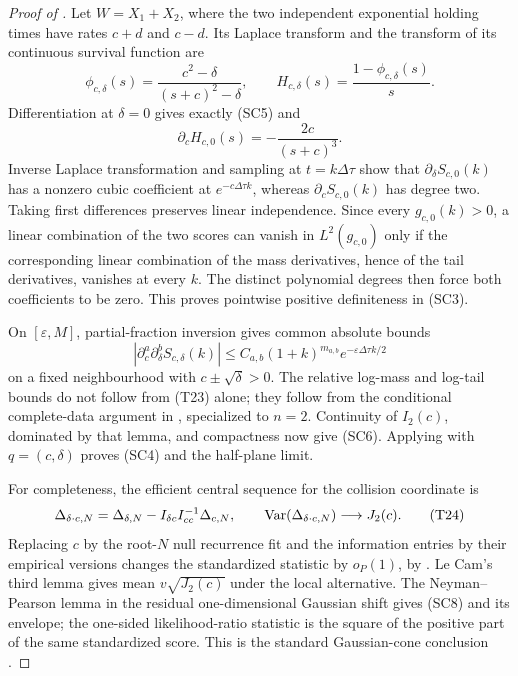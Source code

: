 \begin{proof}[Proof of ]
Let \(W=X_1+X_2\), where the two independent exponential holding times have
rates \(c+d\) and \(c-d\).  Its Laplace transform and the transform of its
continuous survival function are
\[
 \phi_{c,\delta}(s)
 =\frac{c^2-\delta}{(s+c)^2-\delta},
 \qquad
 H_{c,\delta}(s)=\frac{1-\phi_{c,\delta}(s)}s.
\tag{T21}
\]
Differentiation at \(\delta=0\) gives exactly \textup{(SC5)} and
\[
 \partial_cH_{c,0}(s)=-\frac{2c}{(s+c)^3}.
\tag{T22}
\]
Inverse Laplace transformation and sampling at \(t=k\Delta\tau\) show that
\(\partial_\delta S_{c,0}(k)\) has a nonzero cubic coefficient at
\(e^{-c\Delta\tau k}\), whereas \(\partial_cS_{c,0}(k)\) has degree two.
Taking first differences preserves linear independence.  Since every
\(g_{c,0}(k)>0\), a linear combination of the two scores can vanish in
\(L^2(g_{c,0})\) only if the corresponding linear combination of the mass
derivatives, hence of the tail derivatives, vanishes at every \(k\).  The
distinct polynomial degrees then force both coefficients to be zero.  This
proves pointwise positive definiteness in \textup{(SC3)}.

On \([\varepsilon,M]\), partial-fraction inversion gives common absolute
bounds
\[
 |\partial_c^a\partial_\delta^b S_{c,\delta}(k)|
 \le C_{a,b}(1+k)^{m_{a,b}}e^{-\varepsilon\Delta\tau k/2}
\tag{T23}
\]
on a fixed neighbourhood with \(c\pm\sqrt\delta>0\).  The relative log-mass
and log-tail bounds do not follow from \textup{(T23)} alone; they follow from
the conditional complete-data argument in
, specialized to \(n=2\).
Continuity of \(I_2(c)\), dominated by that lemma, and compactness now give
\textup{(SC6)}.  Applying
 with
\(q=(c,\delta)\) proves \textup{(SC4)} and the half-plane limit.

For completeness, the efficient central sequence for the collision
coordinate is
\[
 \Delta_{\delta\cdot c,N}
 =\Delta_{\delta,N}-I_{\delta c}I_{cc}^{-1}\Delta_{c,N},
 \qquad \mathrm{Var}(\Delta_{\delta\cdot c,N})\longrightarrow J_2(c).
\tag{T24}
\]
Replacing \(c\) by the root-\(N\) null recurrence fit and the information
entries by their empirical versions changes the standardized statistic by
\(o_P(1)\), by .  Le Cam's third lemma
gives mean \(v\sqrt{J_2(c)}\) under the local alternative.  The
Neyman--Pearson lemma in the residual one-dimensional Gaussian shift gives
\textup{(SC8)} and its envelope; the one-sided likelihood-ratio statistic is
the square of the positive part of the same standardized score.  This is the
standard Gaussian-cone conclusion
\cite{Chernoff1954LikelihoodRatio,SelfLiang1987NonstandardLRT,
vanDerVaart1998AsymptoticStatistics}.


\end{proof}
